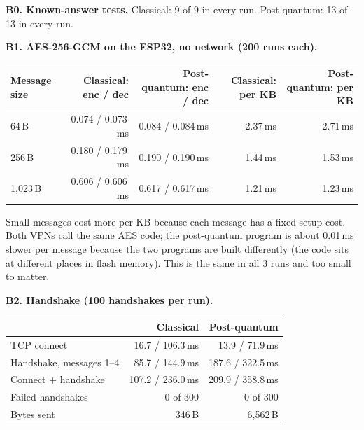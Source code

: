 \documentclass[10pt,a4paper]{article}
\begin{document}
\textbf{B0. Known-answer tests.} Classical: 9 of 9 in every run. Post-quantum: 13 of 13 in every run.

\textbf{B1. AES-256-GCM on the ESP32, no network (200 runs each).}
\begin{table}[H]\centering\small
\begin{tabular}{lrrrr}
\toprule
Message size & Classical: enc / dec & Post-quantum: enc / dec & Classical: per KB & Post-quantum: per KB \\
\midrule
64\,B & 0.074 / 0.073\,ms & 0.084 / 0.084\,ms & 2.37\,ms & 2.71\,ms \\
256\,B & 0.180 / 0.179\,ms & 0.190 / 0.190\,ms & 1.44\,ms & 1.53\,ms \\
1,023\,B & 0.606 / 0.606\,ms & 0.617 / 0.617\,ms & 1.21\,ms & 1.23\,ms \\
\bottomrule
\end{tabular}
\end{table}
Small messages cost more per KB because each message has a fixed setup cost. Both VPNs call the same AES
code; the post-quantum program is about 0.01\,ms slower per message because the two programs are built
differently (the code sits at different places in flash memory). This is the same in all 3 runs and
too small to matter.

\textbf{B2. Handshake (100 handshakes per run).}
\begin{table}[H]\centering\small
\begin{tabular}{lrr}
\toprule
 & Classical & Post-quantum \\
\midrule
TCP connect & 16.7 / 106.3\,ms & 13.9 / 71.9\,ms \\
Handshake, messages 1--4 & 85.7 / 144.9\,ms & 187.6 / 322.5\,ms \\
Connect + handshake & 107.2 / 236.0\,ms & 209.9 / 358.8\,ms \\
Failed handshakes & 0 of 300 & 0 of 300 \\
Bytes sent & 346\,B & 6,562\,B \\
\bottomrule
\end{tabular}
\end{table}
\end{document}
